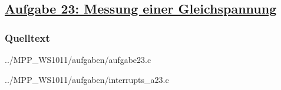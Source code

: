 \subsection
{\href{http://cst.mi.fu-berlin.de/intern/19606-P-MPP/Aufgaben/040801.html}
{Aufgabe 23: Messung einer Gleichspannung}}

\subsubsection*{Quelltext}


{../MPP_WS1011/aufgaben/aufgabe23.c}


{../MPP_WS1011/aufgaben/interrupts_a23.c}
